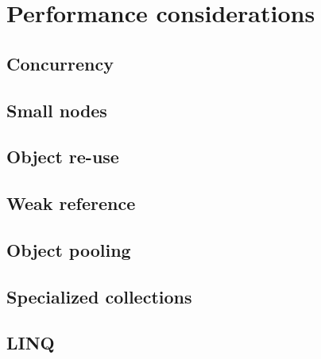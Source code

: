 \section{Performance considerations}
\label{sec:performance}

\subsection{Concurrency}
\label{sec:concurrency}

\subsection{Small nodes}
\label{sec:small-nodes}

\subsection{Object re-use}
\label{sec:object-reuse}

\subsection{Weak reference}
\label{sec:weak-references}

\subsection{Object pooling}
\label{sec:object-pooling}

\subsection{Specialized collections}
\label{sec:specialized-collections}

\subsection{LINQ}
\label{sec:linq}
















